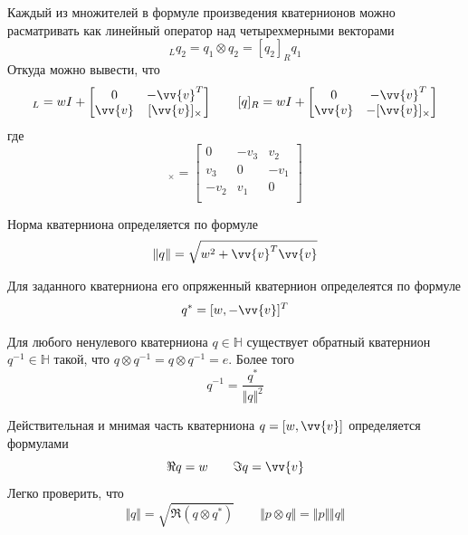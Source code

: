 \documentclass[12pt]{article}
\begin{document}
Каждый из множителей в формуле произведения кватернионов можно расматривать
как линейный оператор над четырехмерными векторами
\begin{equation}
    [q_1]_Lq_2=q_1\otimes q_2=[q_2]_Rq_1
\end{equation}
Откуда можно вывести, что
\begin{equation}
    [q]_L=w I+\begin{bmatrix}
        0 & -\vv{v}^T \\ \vv{v} & [\vv{v}]_\times
    \end{bmatrix}
    \qquad
    [q]_R=w I+\begin{bmatrix}
        0 & -\vv{v}^T \\ \vv{v} & -[\vv{v}]_\times
    \end{bmatrix}
\end{equation}
где
\begin{equation}
    [\vv{v}]_\times=\begin{bmatrix}
        0    & -v_3 & v_2  \\
        v_3  & 0    & -v_1 \\
        -v_2 & v_1  & 0    \\
    \end{bmatrix}
\end{equation}

Норма кватерниона определяется по формуле
\begin{equation}
    \Vert q\Vert=\sqrt{w^2+\vv{v}^T\vv{v}}
\end{equation}

Для заданного кватерниона его опряженный кватернион определеятся по формуле
\begin{equation}
    q^*=[w, -\vv{v}]^T
\end{equation}

Для любого ненулевого кватерниона $q\in\mathbb{H}$ существует обратный кватернион
$q^{-1}\in\mathbb{H}$ такой, что $q \otimes q^{-1} = q \otimes q^{-1}=e$. Более
того
\begin{equation}
    q^{-1}=\frac{q^*}{\Vert q\Vert^2}
\end{equation}

Действительная и мнимая часть кватерниона $q=[w,\vv{v}]$ определяется формулами
\begin{equation}
    \Re q= w \qquad \Im q=\vv{v}
\end{equation}
Легко проверить, что
\begin{equation}
    \Vert q\Vert=\sqrt{\Re(q\otimes q^*)}
    \qquad
    \Vert p \otimes q\Vert=\Vert p\Vert \Vert q\Vert
\end{equation}
\end{document}
